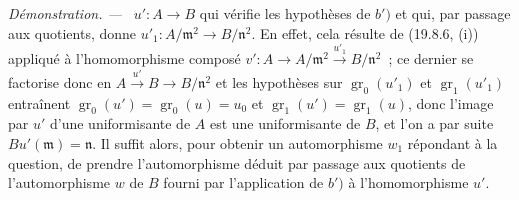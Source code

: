 \documentclass[10pt,oneside]{book}
\newcommand{\oldpage}[2][]{%
  \setcounter{footnote}{0}%
  \marginpar{\scriptsize\textbf{#1}~|~#2}\ignorespaces}
\newenvironment{proof}{%
  \par\medskip\noindent\textit{Démonstration. ---\ }}{\par}
\begin{document}
\begin{proof}
$u':A\to B$ qui vérifie les hypothèses de $b')$ et qui, par passage aux quotients,
donne $u'_1:A/\mathfrak m^2\to B/\mathfrak n^2$. En effet, cela résulte de
(19.8.6, (i)) appliqué à l'homomorphisme composé
$v':A\to A/\mathfrak m^2\xrightarrow{u'_1}B/\mathfrak n^2$~;
\oldpage[0\textsubscript{IV-1}]{166}
ce dernier se factorise donc en $A\xrightarrow{u'}B\to B/\mathfrak n^2$ et
les hypothèses sur $\operatorname{gr}_0(u'_1)$ et
$\operatorname{gr}_1(u'_1)$ entraînent
$\operatorname{gr}_0(u')=\operatorname{gr}_0(u)=u_0$ et
$\operatorname{gr}_1(u')=\operatorname{gr}_1(u)$, donc l'image par $u'$ d'une
uniformisante de $A$ est une uniformisante de $B$, et l'on a par suite
$Bu'(\mathfrak m)=\mathfrak n$. Il suffit alors, pour obtenir un automorphisme
$w_1$ répondant à la question, de prendre l'automorphisme déduit par passage
aux quotients de l'automorphisme $w$ de $B$ fourni par l'application de $b')$
à l'homomorphisme $u'$.
\end{proof}
\end{document}
